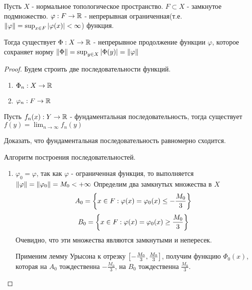 \begin{theorem}
    Пусть $X$ - нормальное топологическое пространство. $F \subset X$ - замкнутое подмножество. $\varphi: F \rightarrow \mathbb{R}$ - непрерывная ограниченная(т.е. $\left\|\varphi\right\| = \sup_{x \in F}|\varphi(x)| < \infty$) функция.

    Тогда существует $\Phi: X \rightarrow \mathbb{R}$ - непрерывное продолжение функции $\varphi$, которое сохраняет норму $\left\|\Phi\right\| = \sup_{y \in X} \left|\Phi(y)\right| = \left\|\varphi\right\|$
\end{theorem}
\begin{proof}
    Будем строить две последовательности функций.

    \begin{enumerate}
        \item $\Phi_n: X \rightarrow \mathbb{R}$
        \item $\varphi_n: F \rightarrow \mathbb{R}$
    \end{enumerate}

    \begin{nota_bene}
        Пусть $f_n(x) : Y \rightarrow \mathbb{R}$ - фундаментальная последовательность, тогда существует $f(y) = \lim_{n \to \infty} f_n(y)$
        \begin{exercise}
            Доказать, что фундаментальная последовательность равномерно сходится.
        \end{exercise}
    \end{nota_bene}

    Алгоритм построения последовательностей.

    \begin{enumerate}
        \item $\varphi_0 = \varphi$, так как $\varphi$ - ограниченная функция, то выполняется $\left\|\varphi\right\| = \left\|\varphi_0\right\| = M_0 < +\infty$
        Определим два замкнутых множества в $X$
        \[
            A_0 = \left\{x \in F : \varphi(x) = \varphi_0(x) \leq -\frac{M_0}{3}\right\}
        \]
        \[
            B_0 = \left\{x \in F : \varphi(x) = \varphi_0(x) \geq \frac{M_0}{3}\right\}
        \]
        Очевидно, что эти множества являются замкнутыми и непересек.

        Применим лемму Урысона к отрезку $\left[-\frac{M_0}{3}, \frac{M_0}{3}\right]$, получим функцию $\Phi_0(x)$, которая на $A_0$ тождественна $-\frac{M_0}{3}$, на $B_0$ тождественна $\frac{M_0}{3}$.


\end{enumerate}
\end{proof}

